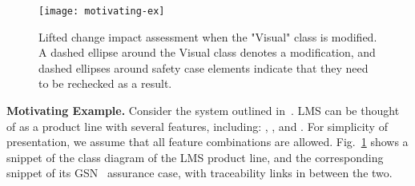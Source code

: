 
\begin{figure}[t]
	\centering
	\texttt{[image: motivating-ex]}
	\caption{Lifted change impact assessment when the "Visual" class is modified. A dashed ellipse around the Visual class denotes a modification, and dashed ellipses around safety case elements indicate that they need to be rechecked as a result.}
	\label{fig:ex}	
	\vspace{-0.3in}
\end{figure}

\vskip 0.1in
\noindent
{\bf Motivating Example.}
Consider the  system outlined in~\cite{Chechik:2020}. 
LMS can be thought of as a product line with several features, including: , , and . For simplicity of presentation, we assume that all feature combinations are allowed.
Fig.~\ref{fig:ex} shows a snippet of the class diagram of the LMS product line, and the corresponding snippet of its GSN~\cite{Kelly:2004} assurance case, with traceability links in between the two. 


